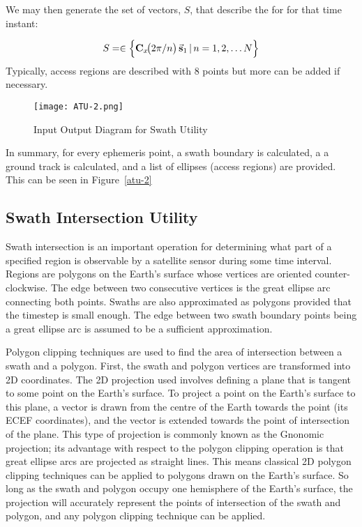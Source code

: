We may then generate the set of vectors, $S$, that describe the \gls{for} for
that time instant:

\begin{equation}
    S = \in  \left\{ \bm{\mathrm{C}}_{x}\!\!\left(2\pi/n \right) \vec{\bm{\mathrm{s}}}_{1} \, \vert \, n = 1, 2, \ldots N \right\}
\end{equation}
Typically, access regions are described with 8 points but more can be added if
necessary. 


\begin{figure}[h]
    \centering
    \texttt{[image: ATU-2.png]} 
    \caption{Input Output Diagram for Swath Utility}
    \label{fig:atu-2} 
\end{figure}

In summary, for every ephemeris point, a swath boundary is calculated, a a
ground track is calculated, and a list of ellipses (access regions) are
provided. This can be seen in Figure~\ref{atu-2}


\subsection{ Swath Intersection Utility }

Swath intersection is an important operation for determining what part of a
specified region is observable by a satellite sensor during some time interval.
Regions are polygons on the Earth’s surface whose vertices are oriented
counter-clockwise. The edge between two consecutive vertices is the great
ellipse arc connecting both points. Swaths are also approximated as polygons
provided that the timestep is small enough. The edge between two swath boundary
points being a great ellipse arc is assumed to be a sufficient approximation.

Polygon clipping techniques are used to find the area of intersection between a
swath and a polygon. First, the swath and polygon vertices are transformed into
2D coordinates. The 2D projection used involves defining a plane that is
tangent to some point on the Earth’s surface.  To project a point on the
Earth’s surface to this plane, a vector is drawn from the centre of the Earth
towards the point (its ECEF coordinates), and the vector is extended towards
the point of intersection of the plane. This type of projection is commonly
known as the Gnonomic projection; its advantage with respect to the polygon
clipping operation is that great ellipse arcs are projected as straight lines.
This means classical 2D polygon clipping techniques can be applied to polygons
drawn on the Earth’s surface. So long as the swath and polygon occupy one
hemisphere of the Earth’s surface, the projection will accurately represent the
points of intersection of the swath and polygon, and any polygon clipping
technique can be applied.


